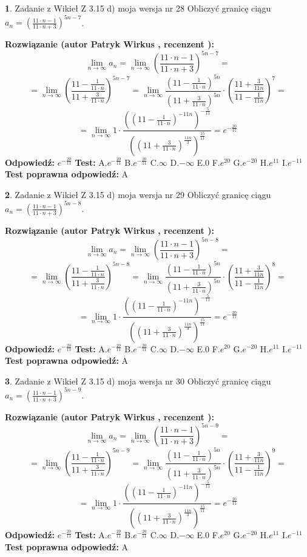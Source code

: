 \documentclass[12pt, a4paper]{article}
\theoremstyle{definition} %
\newtheorem{zad}{}
\newcommand{\zadStart}[1]{\begin{zad}#1\newline}
\newcommand{\zadStop}{\end{zad}}
\newcommand{\rozwStart}[2]{\noindent \textbf{Rozwiązanie (autor #1 , recenzent #2): }\newline}
\newcommand{\rozwStop}{\newline}
\newcommand{\odpStart}{\noindent \textbf{Odpowiedź:}\newline}
\newcommand{\odpStop}{\newline}
\newcommand{\testStart}{\noindent \textbf{Test:}\newline}
\newcommand{\testStop}{\newline}
\newcommand{\kluczStart}{\noindent \textbf{Test poprawna odpowiedź:}\newline}
\newcommand{\kluczStop}{\newline}
\begin{document}
\zadStart{Zadanie z Wikieł Z 3.15 d) moja wersja nr 28}
Obliczyć granicę ciągu $a_{n}=(\frac{11\cdot n - 1}{11 \cdot n + 3})^{5n-7}$.
\zadStop
\rozwStart{Patryk Wirkus}{}
$$\lim\limits_{n\to\infty} a_{n} = \lim\limits_{n\to\infty}(\frac{11\cdot n - 1}{11 \cdot n + 3})^{5n-7}=$$
$$=\lim\limits_{n\to\infty}(\frac{11 - \frac{1}{11\cdot n}}{11 + \frac{3}{11 \cdot n}})^{5n-7}=\lim\limits_{n\to\infty}\frac{(11 - \frac{1}{11\cdot n})^{5n}}{(11 + \frac{3}{11\cdot n})^{5n}} \cdot (\frac{11+\frac{3}{11n}}{11-\frac{1}{11n}})^{7}=$$
$$=\lim\limits_{n\to\infty} 1 \cdot \frac{((11-\frac{1}{11 \cdot n})^{-11n})^{-\frac{5}{11}}}{((11+\frac{3}{11 \cdot n})^{\frac{11n}{3}})^{\frac{15}{11}}} =e^{-\frac{20}{11}}$$
\rozwStop
\odpStart
$e^{-\frac{20}{11}}$
\odpStop
\testStart
A.$ e^{-\frac{20}{11}}$
B.$ e^{-\frac{20}{11}}$
C.$\infty$
D.$-\infty$
E.$0$
F.$e^{20}$
G.$e^{-20}$
H.$e^{11}$
I.$e^{-11}$
\testStop
\kluczStart
A
\kluczStop



\zadStart{Zadanie z Wikieł Z 3.15 d) moja wersja nr 29}
Obliczyć granicę ciągu $a_{n}=(\frac{11\cdot n - 1}{11 \cdot n + 3})^{5n-8}$.
\zadStop
\rozwStart{Patryk Wirkus}{}
$$\lim\limits_{n\to\infty} a_{n} = \lim\limits_{n\to\infty}(\frac{11\cdot n - 1}{11 \cdot n + 3})^{5n-8}=$$
$$=\lim\limits_{n\to\infty}(\frac{11 - \frac{1}{11\cdot n}}{11 + \frac{3}{11 \cdot n}})^{5n-8}=\lim\limits_{n\to\infty}\frac{(11 - \frac{1}{11\cdot n})^{5n}}{(11 + \frac{3}{11\cdot n})^{5n}} \cdot (\frac{11+\frac{3}{11n}}{11-\frac{1}{11n}})^{8}=$$
$$=\lim\limits_{n\to\infty} 1 \cdot \frac{((11-\frac{1}{11 \cdot n})^{-11n})^{-\frac{5}{11}}}{((11+\frac{3}{11 \cdot n})^{\frac{11n}{3}})^{\frac{15}{11}}} =e^{-\frac{20}{11}}$$
\rozwStop
\odpStart
$e^{-\frac{20}{11}}$
\odpStop
\testStart
A.$ e^{-\frac{20}{11}}$
B.$ e^{-\frac{20}{11}}$
C.$\infty$
D.$-\infty$
E.$0$
F.$e^{20}$
G.$e^{-20}$
H.$e^{11}$
I.$e^{-11}$
\testStop
\kluczStart
A
\kluczStop



\zadStart{Zadanie z Wikieł Z 3.15 d) moja wersja nr 30}
Obliczyć granicę ciągu $a_{n}=(\frac{11\cdot n - 1}{11 \cdot n + 3})^{5n-9}$.
\zadStop
\rozwStart{Patryk Wirkus}{}
$$\lim\limits_{n\to\infty} a_{n} = \lim\limits_{n\to\infty}(\frac{11\cdot n - 1}{11 \cdot n + 3})^{5n-9}=$$
$$=\lim\limits_{n\to\infty}(\frac{11 - \frac{1}{11\cdot n}}{11 + \frac{3}{11 \cdot n}})^{5n-9}=\lim\limits_{n\to\infty}\frac{(11 - \frac{1}{11\cdot n})^{5n}}{(11 + \frac{3}{11\cdot n})^{5n}} \cdot (\frac{11+\frac{3}{11n}}{11-\frac{1}{11n}})^{9}=$$
$$=\lim\limits_{n\to\infty} 1 \cdot \frac{((11-\frac{1}{11 \cdot n})^{-11n})^{-\frac{5}{11}}}{((11+\frac{3}{11 \cdot n})^{\frac{11n}{3}})^{\frac{15}{11}}} =e^{-\frac{20}{11}}$$
\rozwStop
\odpStart
$e^{-\frac{20}{11}}$
\odpStop
\testStart
A.$ e^{-\frac{20}{11}}$
B.$ e^{-\frac{20}{11}}$
C.$\infty$
D.$-\infty$
E.$0$
F.$e^{20}$
G.$e^{-20}$
H.$e^{11}$
I.$e^{-11}$
\testStop
\kluczStart
A
\kluczStop
\end{document}
